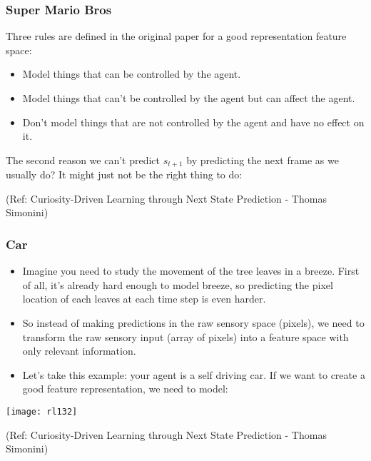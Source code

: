 \begin{frame}[fragile]\frametitle{Super Mario Bros}

Three rules are defined in the original paper for a good representation feature space:

\begin{itemize}
\item Model things that can be controlled by the agent.
\item Model things that can’t be controlled by the agent but can affect the agent.
\item Don’t model things that are not controlled by the agent and have no effect on it.
\end{itemize}

The second reason we can’t predict $s_{t+1}$ by predicting the next frame as we usually do? It might just not be the right thing to do:

{\tiny (Ref: Curiosity-Driven Learning through Next State Prediction - Thomas Simonini)}


\end{frame}

\begin{frame}[fragile]\frametitle{Car}



\begin{itemize}
\item Imagine you need to study the movement of the tree leaves in a breeze. First of all, it’s already hard enough to model breeze, so predicting the pixel location of each leaves at each time step is even harder.
\item So instead of making predictions in the raw sensory space (pixels), we need to transform the raw sensory input (array of pixels) into a feature space with only relevant information.
\item Let’s take this example: your agent is a self driving car. If we want to create a good feature representation, we need to model:
\end{itemize}

\begin{center}
\texttt{[image: rl132]}
\end{center}


{\tiny (Ref: Curiosity-Driven Learning through Next State Prediction - Thomas Simonini)}


\end{frame}

